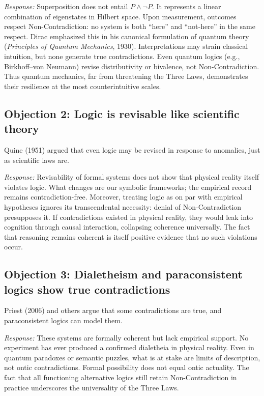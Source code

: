 \documentclass[12pt]{article}
\begin{document}
\emph{Response:} Superposition does not entail $P \land \lnot P$. It represents a linear combination of eigenstates in Hilbert space. Upon measurement, outcomes respect Non-Contradiction: no system is both ``here'' and ``not-here'' in the same respect. Dirac emphasized this in his canonical formulation of quantum theory (\emph{Principles of Quantum Mechanics}, 1930). Interpretations may strain classical intuition, but none generate true contradictions. Even quantum logics (e.g., Birkhoff--von Neumann) revise distributivity or bivalence, not Non-Contradiction. Thus quantum mechanics, far from threatening the Three Laws, demonstrates their resilience at the most counterintuitive scales.

\subsection*{Objection 2: Logic is revisable like scientific theory}
Quine (1951) argued that even logic may be revised in response to anomalies, just as scientific laws are.

\emph{Response:} Revisability of formal systems does not show that physical reality itself violates logic. What changes are our symbolic frameworks; the empirical record remains contradiction-free. Moreover, treating logic as on par with empirical hypotheses ignores its transcendental necessity: denial of Non-Contradiction presupposes it. If contradictions existed in physical reality, they would leak into cognition through causal interaction, collapsing coherence universally. The fact that reasoning remains coherent is itself positive evidence that no such violations occur.

\subsection*{Objection 3: Dialetheism and paraconsistent logics show true contradictions}
Priest (2006) and others argue that some contradictions are true, and paraconsistent logics can model them.

\emph{Response:} These systems are formally coherent but lack empirical support. No experiment has ever produced a confirmed dialetheia in physical reality. Even in quantum paradoxes or semantic puzzles, what is at stake are limits of description, not ontic contradictions. Formal possibility does not equal ontic actuality. The fact that all functioning alternative logics still retain Non-Contradiction in practice underscores the universality of the Three Laws.
\end{document}
